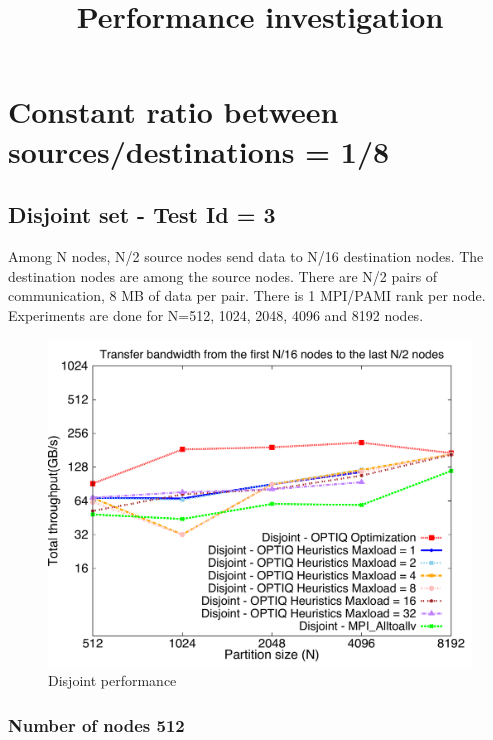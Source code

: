 \documentclass[letter]{article}
\title{Performance investigation}
\begin{document}
\maketitle

\section{Constant ratio between sources/destinations =  1/8}

\subsection{Disjoint set - Test Id = 3}

Among N nodes, N/2 source nodes send data to N/16 destination nodes. The destination nodes are among the source nodes. There are N/2 pairs of communication, 8 MB of data per pair. There is 1 MPI/PAMI rank per node. Experiments are done for N=512, 1024, 2048, 4096 and 8192 nodes.

\begin{figure}[h]
\vspace{-0.1in}
\centering
\includegraphics[scale=0.50]{report_figures/constantr_3.pdf}
\vspace{-0.1in}
\caption{Disjoint performance}
\vspace{-0.1in}
\label{fig:patterns}
\end{figure}

\newpage

\subsubsection{Number of nodes 512}
\end{document}
